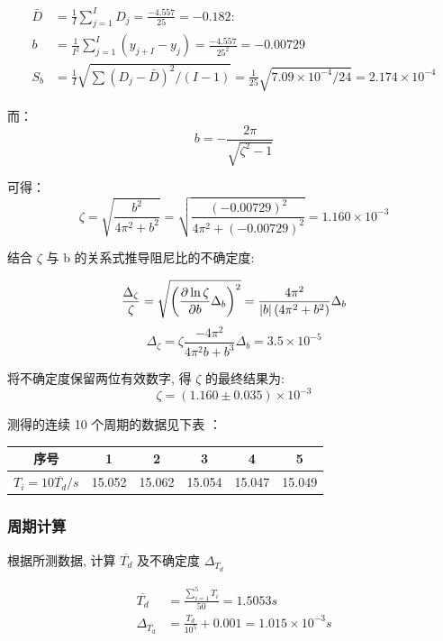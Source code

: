 \documentclass[UTF8]{ctexart}
\begin{document}
\begin{align}
    \bar{D}&=\frac{1}{I} \sum_{j=1}^{I} D_{j}=\frac{-4.557}{25}=-0.182:  \nonumber  \\
    b&=\frac{1}{I^{2}} \sum_{j=1}^{I}\left(y_{j+I}-y_{j}\right)=\frac{-4.557}{25^{2}}=-0.00729 \nonumber \\
    S_{b}&=\frac{1}{I} \sqrt{\sum\left(D_{j}-\bar{D}\right)^{2} /(I-1)}=\frac{1}{25} \sqrt{7.09 \times 10^{-4} / 24}=2.174 \times 10^{-4} \nonumber 
\end{align}
    


而：
$$
b=-\frac{2 \pi}{\sqrt{\zeta^{2}-1}} 
$$

可得：
    $$
    \zeta=\sqrt{\frac{b^{2}}{4 \pi^{2}+b^{2}}}=\sqrt{\frac{{(-0.00729)}^{2}}{4 \pi^{2}+{(-0.00729)}^{2}}}=1.160 \times 10^{-3}
    $$


结合  $\zeta$  与  b  的关系式推导阻尼比的不确定度:

$$
\frac{\Delta_{\zeta}}{\zeta}=\sqrt{\left(\frac{\partial \ln \zeta}{\partial b} \Delta_{b}\right)^{2}}=\frac{4 \pi^{2}}{|b|\left(4 \pi^{2}+b^{2}\right)} \Delta_{b} \\
$$
$$
\Delta_{\zeta}=\zeta \frac{-4 \pi^{2}}{4 \pi^{2} b+b^{3}} \Delta_{b}=3.5 \times 10^{-5}
$$


将不确定度保留两位有效数字, 得  $\zeta $ 的最终结果为:
    $$
    \zeta=(1.160 \pm 0.035) \times 10^{-3}
    $$


    测得的连续 10 个周期的数据见下表 ：

    \begin{center}
        \begin{tabular}{|c|c|c|c|c|c|}
            \hline 序号 & 1 & 2 & 3 & 4 & 5 \\
            \hline $T_{i}=10 \overline{T_{d}} / s$  &  15.052  &  15.062  &  15.054  &  15.047  &  15.049  \\
            \hline
        \end{tabular}
    \end{center}
  


    \subsubsection{周期计算}
    根据所测数据, 计算 $ \overline{T_{d}} $ 及不确定度 $ \Delta_{\overline{T_{d}}} $
    
    \begin{align}
    \overline{T_{d}}&=\frac{\sum_{i=1}^{5} T_{i}}{50}=1.5053 s \nonumber\\
    \Delta_{\overline{T_{d}}}&=\frac{T_{d}}{10^{5}}+0.001=1.015 \times 10^{-3} s\nonumber
    \end{align}
    
\end{document}
